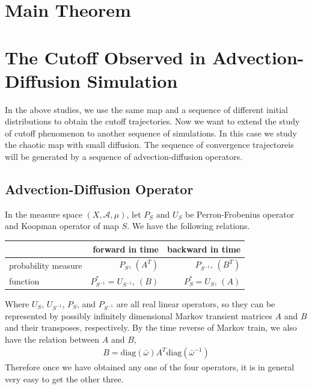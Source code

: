 \documentclass{article}
\begin{document}



\section{Main Theorem}




\section{The Cutoff Observed in Advection-Diffusion Simulation}
In the above studies, we use the same map and a sequence of different initial distributions to obtain the cutoff trajectories. Now we want to extend the study of cutoff phenomenon to another sequence of simulations. In this case we study the chaotic map with small diffusion. The sequence of convergence trajectoreis will be generated by a sequence of advection-diffusion operators. 


\subsection{Advection-Diffusion Operator}
In the measure space $(X,\mathcal{A},\mu)$, let $P_S$ and $U_S$ be Perron-Frobenius operator and Koopman operator of map $S$. We have the following relations.
 
\vspace{0.4cm}
\begin{tabular}{l|rr}
                      & forward in time                    & backward in time     \\
\hline
        probability measure & $P_S$, $(A^T)$                       &  $P_{S^{-1}}$, $(B^T)$  \\
        function            & $P_{S^{-1}}^* = U_{S^{-1}}$, $(B)$ &  $P_S^* = U_S $, $(A)$ 
\end{tabular}
\vspace{0.4cm}

Where $U_S$, $U_{S^{-1}}$, $P_S$, and $P_{S^{-1}}$ are all real linear operators, so they can be represented by possibly infinitely dimensional Markov transient matrices $A$ and $B$ and their transposes, respectively. By the time reverse of Markov train, we also have the relation between $A$ and $B$,
  \begin{eqnarray}
  \label{ABrelation}
         B = \text{diag}(\bar{\omega}) A^T \text{diag}({\bar{\omega}}^{-1}) 
  \end{eqnarray}   
Therefore once we have obtained any one of the four operators, it is in general very easy to get the other three.  
\end{document}
